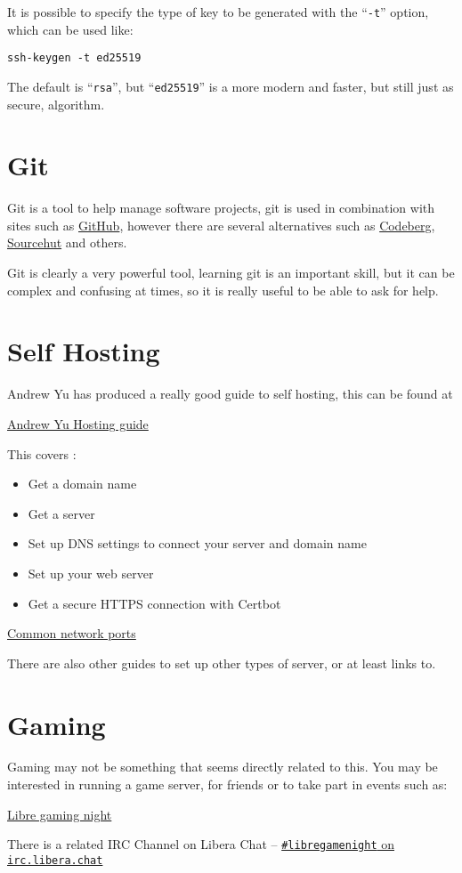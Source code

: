 \documentclass{extbook}
\newcommand\libera[1]{\href{https://web.libera.chat/?channel=\##1}{\texttt{\##1} on \texttt{irc.libera.chat}}}
\begin{document}
It is possible to specify the type of key to be generated with the ``\verb|-t|'' option, which can be used like:

\begin{verbatim}
ssh-keygen -t ed25519
\end{verbatim}

The default is ``\verb|rsa|'', but ``\verb|ed25519|'' is a more modern and faster, but still just as secure, algorithm.

\section{Git}

Git is a tool to help manage software projects, git is used in combination with sites such as \href{https://github.com/}{GitHub}, however there are several alternatives such as
\href{https://codeberg.org/}{Codeberg}, \href{https://sr.ht/}{Sourcehut} and others.

Git is clearly a very powerful tool, learning git is an important skill, but it can be complex and confusing at times, so it is really useful to be able to ask for help.



\section{Self Hosting}

Andrew Yu has produced a really good guide to self hosting, this can be found at

\href{https://host.andrewyu.org/}{Andrew Yu Hosting guide}

This covers :

\begin{itemize}
\item Get a domain name
\item Get a server
\item Set up DNS settings to connect your server and domain name
\item Set up your web server
\item Get a secure HTTPS connection with Certbot
\end{itemize}

\href{https://networkverge.com/common-ports/}{Common network ports}

There are also other guides to set up other types of server, or at least links to.

\section{Gaming}

Gaming may not be something that seems directly related to this. You may be interested in running a game server, for friends or to take part in events such as:

\href{https://libregaming.org/}{Libre gaming night}

There is a related IRC Channel on Libera Chat -- \libera{libregamenight}

\appendix

\end{document}
